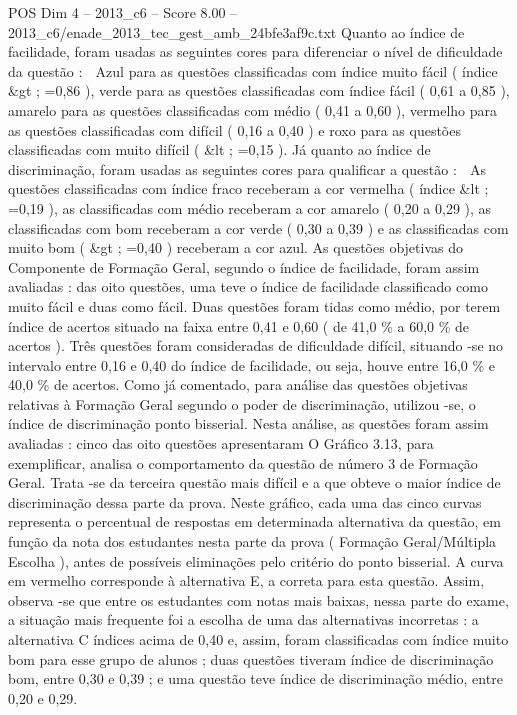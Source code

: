 \begin{textsample}{POS Dim 4 – 2013\_c6 – Score 8.00 – 2013\_c6/enade\_2013\_tec\_gest\_amb\_24bfe3af9c.txt}
Quanto ao índice de facilidade, foram usadas as seguintes cores para diferenciar o nível de dificuldade da questão :  Azul para as questões classificadas com índice muito fácil ( índice \&gt ; =0,86 ), verde para as questões classificadas com índice fácil ( 0,61 a 0,85 ), amarelo para as questões classificadas com médio ( 0,41 a 0,60 ), vermelho para as questões classificadas com difícil ( 0,16 a 0,40 ) e roxo para as questões classificadas com muito difícil ( \&lt ; =0,15 ).
Já quanto ao índice de discriminação, foram usadas as seguintes cores para qualificar a questão :  As questões classificadas com índice fraco receberam a cor vermelha ( índice \&lt ; =0,19 ), as classificadas com médio receberam a cor amarelo ( 0,20 a 0,29 ), as classificadas com bom receberam a cor verde ( 0,30 a 0,39 ) e as classificadas com muito bom ( \&gt ; =0,40 ) receberam a cor azul.
As questões objetivas do Componente de Formação Geral, segundo o índice de facilidade, foram assim avaliadas : das oito questões, uma teve o índice de facilidade classificado como muito fácil e duas como fácil.
Duas questões foram tidas como médio, por terem índice de acertos situado na faixa entre 0,41 e 0,60 ( de 41,0 \% a 60,0 \% de acertos ).
Três questões foram consideradas de dificuldade difícil, situando -se no intervalo entre 0,16 e 0,40 do índice de facilidade, ou seja, houve entre 16,0 \% e 40,0 \% de acertos.
Como já comentado, para análise das questões objetivas relativas à Formação Geral segundo o poder de discriminação, utilizou -se, o índice de discriminação ponto bisserial.
Nesta análise, as questões foram assim avaliadas : cinco das oito questões apresentaram O Gráfico 3.13, para exemplificar, analisa o comportamento da questão de número 3 de Formação Geral.
Trata -se da terceira questão mais difícil e a que obteve o maior índice de discriminação dessa parte da prova.
Neste gráfico, cada uma das cinco curvas representa o percentual de respostas em determinada alternativa da questão, em função da nota dos estudantes nesta parte da prova ( Formação Geral/Múltipla Escolha ), antes de possíveis eliminações pelo critério do ponto bisserial.
A curva em vermelho corresponde à alternativa E, a correta para esta questão.
Assim, observa -se que entre os estudantes com notas mais baixas, nessa parte do exame, a situação mais frequente foi a escolha de uma das alternativas incorretas : a alternativa C índices acima de 0,40 e, assim, foram classificadas com índice muito bom para esse grupo de alunos ; duas questões tiveram índice de discriminação bom, entre 0,30 e 0,39 ; e uma questão teve índice de discriminação médio, entre 0,20 e 0,29.

\end{textsample}
